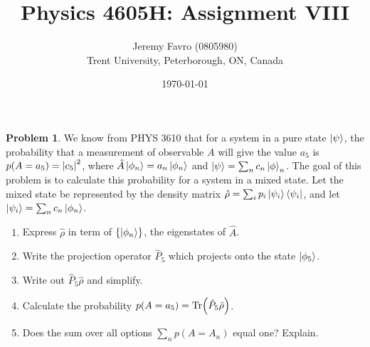 \documentclass[10pt]{article}
\title{Physics 4605H: Assignment VIII}
\author{Jeremy Favro (0805980) \\ Trent University, Peterborough, ON, Canada}
\date{\today}
\theoremstyle{definition}
\newtheorem{problem}{Problem}
\begin{document}
\maketitle

\begin{problem}
We know from PHYS 3610 that for a system in a pure state $\ket{\psi}$, the probability that
a measurement of observable $A$ will give the value $a_5$ is $p(A=a_5)=\abs{c_5}^2$, where
$\hat{A}\ket{\phi_n}=a_n\ket{\phi_n}$ and $\ket{\psi}=\sum_nc_n\ket{\phi}_n$.
The goal of this problem is to calculate this probability for a system in a mixed state. Let
the mixed state be represented by the density matrix $\hat{\rho}=\sum_i p_i\ket{\psi_i}\bra{\psi_i}$, and let
$\ket{\psi_i}=\sum_nc_n\ket{\phi_n}$.
\begin{enumerate}[label=(\alph*)]
  \item Express $\hat{\rho}$ in term of $\left\{\ket{\phi_n}\right\}$, the eigenstates of $\hat{A}$.
  \item Write the projection operator $\hat{P}_5$ which projects onto the state $\ket{\phi_5}$.
  \item Write out $\hat{P}_5\hat{\rho}$ and simplify.
  \item Calculate the probability $p(A=a_5)=\Tr(\hat{P}_5\hat{\rho})$.
  \item Does the sum over all options $\sum_n p(A=A_n)$ equal one? Explain.
\end{enumerate}
\end{problem}
\end{document}
